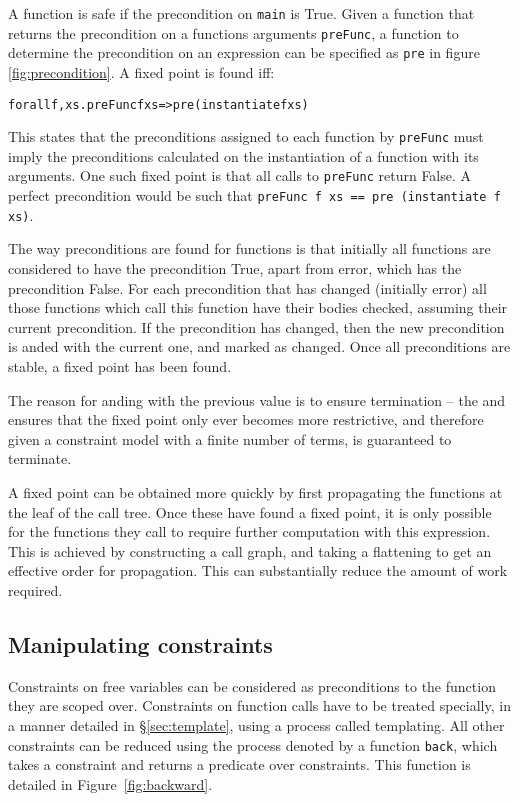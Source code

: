 \documentclass[preprint]{sigplanconf}
\newcommand{\T}[1]{\texttt{#1}}
\newenvironment{code}{\begin{alltt}\small}{\end{alltt}}
\begin{document}
A function is safe if the precondition on \T{main} is True. Given a function that returns the precondition on a functions arguments \T{preFunc}, a function to determine the precondition on an expression can be specified as \T{pre} in figure \ref{fig:precondition}. A fixed point is found iff:

\begin{code}
forall f, xs . preFunc f xs => pre (instantiate f xs)
\end{code}

This states that the preconditions assigned to each function by \T{preFunc} must imply the preconditions calculated on the instantiation of a function with its arguments. One such fixed point is that all calls to \T{preFunc} return False. A perfect precondition would be such that \T{preFunc f xs == pre (instantiate f xs)}.

The way preconditions are found for functions is that initially all functions are considered to have the precondition True, apart from error, which has the precondition False. For each precondition that has changed (initially error) all those functions which call this function have their bodies checked, assuming their current precondition. If the precondition has changed, then the new precondition is anded with the current one, and marked as changed. Once all preconditions are stable, a fixed point has been found.

The reason for anding with the previous value is to ensure termination -- the and ensures that the fixed point only ever becomes more restrictive, and therefore given a constraint model with a finite number of terms, is guaranteed to terminate.

A fixed point can be obtained more quickly by first propagating the functions at the leaf of the call tree. Once these have found a fixed point, it is only possible for the functions they call to require further computation with this expression. This is achieved by constructing a call graph, and taking a flattening to get an effective order for propagation. This can substantially reduce the amount of work required.


\subsection{Manipulating constraints}
\label{sec:backward}

Constraints on free variables can be considered as preconditions to the function they are scoped over. Constraints on function calls have to be treated specially, in a manner detailed in \S\ref{sec:template}, using a process called templating. All other constraints can be reduced using the process denoted by a function \T{back}, which takes a constraint and returns a predicate over constraints. This function is detailed in Figure~\ref{fig:backward}.
\end{document}
